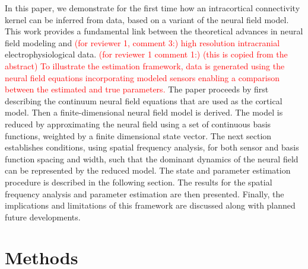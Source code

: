 \documentclass[review,authoryear,3p]{elsarticle}
\newcommand{\dean}[1]{\textcolor{red}{#1}}
\begin{document}
In this paper, we demonstrate for the first time how an intracortical connectivity kernel can be inferred from data, based on a variant of the \citet{Wilson1973} neural field model. This work provides a fundamental link between the theoretical advances in neural field modeling and \dean{(for reviewer 1, comment 3:) high resolution intracranial} electrophysiological data. \dean{(for reviewer 1 comment 1:) (this is copied from the abstract) To illustrate the estimation framework, data is generated using the neural field equations incorporating modeled sensors enabling a comparison between the estimated and true parameters.} The paper proceeds by first describing the continuum neural field equations that are used as the cortical model. Then a finite-dimensional neural field model is derived. The model is reduced by approximating the neural field using a set of continuous basis functions, weighted by a finite dimensional state vector. The next section establishes conditions, using spatial frequency analysis, for both sensor and basis function spacing and width, such that the dominant dynamics of the neural field can be represented by the reduced model. The state and parameter estimation procedure is described in the following section. The results for the spatial frequency analysis and parameter estimation are then presented. Finally, the implications and limitations of this framework are discussed along with planned future developments.

\section{Methods}
\end{document}
